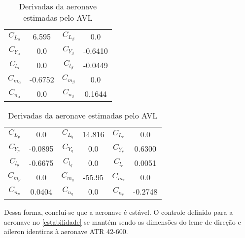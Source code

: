\begin{table}[H]
\centering
\begin{tabular}{cccc}
\toprule
$ C_{L_{\alpha}} $ &   6.595 & $ C_{L_{\beta}} $ &     0.0  \\ [0.3cm]
$ C_{Y_{\alpha}} $ &     0.0 & $ C_{Y_{\beta}} $ & -0.6410  \\ [0.3cm]
$ C_{l_{\alpha}} $ &     0.0 & $ C_{l_{\beta}} $ & -0.0449  \\ [0.3cm]
$ C_{m_{\alpha}} $ & -0.6752 & $ C_{m_{\beta}} $ &     0.0  \\ [0.3cm]
$ C_{n_{\alpha}} $ &     0.0 & $ C_{n_{\beta}} $ &  0.1644  \\ [0.3cm]
\bottomrule
\end{tabular}
\begin{tabular}{cccccc}
\toprule
$ C_{L_{p}} $ &     0.0 & $ C_{L_{q}} $ & 14.816  & $ C_{L_{r}} $ &   0.0   \\ [0.3cm]
$ C_{Y_{p}} $ & -0.0895 & $ C_{Y_{q}} $ &    0.0  & $ C_{Y_{r}} $ & 0.6300  \\ [0.3cm]
$ C_{l_{p}} $ & -0.6675 & $ C_{l_{q}} $ &    0.0  & $ C_{l_{r}} $ & 0.0051 \\ [0.3cm]
$ C_{m_{p}} $ &     0.0 & $ C_{m_{q}} $ & -55.95  & $ C_{m_{r}} $ &   0.0  \\ [0.3cm]
$ C_{n_{p}} $ &  0.0404 & $ C_{n_{q}} $ &    0.0  & $ C_{n_{r}} $ & -0.2748 \\ [0.3cm]
\bottomrule
\end{tabular}
\caption[Derivadas da aeronave estimadas pelo AVL]{Derivadas da aeronave estimadas pelo AVL}
\label{tbl:derivadas_avl}
\end{table}

Dessa forma, conclui-se que a aeronave é estável. O controle definido para a aeronave no \autoref{estabilidade} se mantém sendo as dimensões do leme de direção e aileron identicas à aeronave ATR 42-600.
